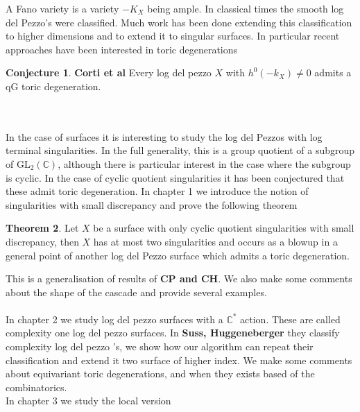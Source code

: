 \documentclass[11pt]{report}
\theoremstyle{definition}
\newtheorem{thm}{Theorem}[section]
\theoremstyle{definition}
\theoremstyle{definition}
\theoremstyle{definition}
\theoremstyle{definition}
\theoremstyle{definition}
\theoremstyle{definition}
\newtheorem{conj}[thm]{Conjecture}
\theoremstyle{definition}
\newcommand{\ldp}{log del pezzo }
\newcommand{\gl}{\text{GL}_2 (\mathbb{C})}
\begin{document}
 

A Fano variety is a variety $-K_X$ being ample. In classical times the smooth log del Pezzo's were classified. Much work has been done extending this classification to higher dimensions and to extend it to singular surfaces. In particular recent approaches have been interested in toric degenerations 
\vspace{0.3cm}
\begin{conj}
\textbf{Corti et al}
Every \ldp $X$ with $h^0(-k_X) \neq 0$ admits a qG toric degeneration.
\end{conj}
\\
\\
In the case of surfaces it is interesting to study the log del Pezzos with log terminal singularities. In the full generality, this is a group quotient of a subgroup of $\gl$, although there is particular interest in the case where the subgroup is cyclic. In the case of cyclic quotient singularities it has been conjectured that these admit toric degeneration. In chapter 1 we introduce the notion of singularities with small discrepancy and prove the following theorem
\vspace{0.3cm}
\begin{thm}
Let $X$ be a surface with only cyclic quotient singularities with small discrepancy, then $X$ has at most two singularities and occurs as a blowup in a general point of another log del Pezzo surface which admits a toric degeneration.
\end{thm}
This is a generalisation of results of \textbf{CP and CH}. We also make some comments about the shape of the cascade and provide several examples.
\\ \\
In chapter 2 we study \ldp surfaces with a $\mathbb{C}^*$ action. These are called complexity one \ldp surfaces. In \textbf{Suss, Huggeneberger} they classify complexity \ldp's, we show how our algorithm can repeat their classification and extend it two surface of higher index. We make some comments about equivariant toric degenerations, and when they exists based of the combinatorics. 
\\
In chapter 3 we study the local version 
\end{document}

